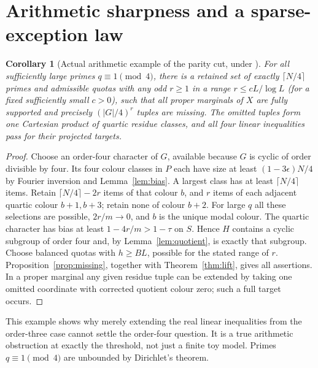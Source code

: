 \documentclass[11pt]{article}
\newtheorem{corollary}[theorem]{Corollary}
\theoremstyle{remark}\newtheorem{remark}[theorem]{Remark}
\begin{document}
\section{Arithmetic sharpness and a sparse-exception law}\label{sec:examples}
\begin{corollary}[Actual arithmetic example of the parity cut, under \DGRH]\label{cor:primeexample}
For all sufficiently large primes $q\equiv1\pmod4$, there is a retained set of exactly $\lceil N/4\rceil$ primes and admissible quotas with any odd $r\ge1$ in a range $r\le cL/\log L$ (for a fixed sufficiently small $c>0$), such that all proper marginals of $X$ are fully supported and precisely $(|G|/4)^r$ tuples are missing. The omitted tuples form one Cartesian product of quartic residue classes, and all four linear inequalities pass for their projected targets.
\end{corollary}
\begin{proof}
Choose an order-four character of $G$, available because $G$ is cyclic of order divisible by four. Its four colour classes in $P$ each have size at least $(1-3\epsilon)N/4$ by Fourier inversion and Lemma~\ref{lem:bias}. A largest class has at least $\lceil N/4\rceil$ items. Retain $\lceil N/4\rceil-2r$ items of that colour $b$, and $r$ items of each adjacent quartic colour $b+1,b+3$; retain none of colour $b+2$. For large $q$ all these selections are possible, $2r/m\to0$, and $b$ is the unique modal colour. The quartic character has bias at least $1-4r/m>1-\tau$ on $S$. Hence $H$ contains a cyclic subgroup of order four and, by Lemma~\ref{lem:quotient}, is exactly that subgroup. Choose balanced quotas with $h\ge BL$, possible for the stated range of $r$. Proposition~\ref{prop:missing}, together with Theorem~\ref{thm:lift}, gives all assertions. In a proper marginal any given residue tuple can be extended by taking one omitted coordinate with corrected quotient colour zero; such a full target occurs.
\end{proof}

This example shows why merely extending the real linear inequalities from the order-three case cannot settle the order-four question. It is a true arithmetic obstruction at exactly the threshold, not just a finite toy model. Primes $q\equiv1\pmod4$ are unbounded by Dirichlet's theorem.
\end{document}
